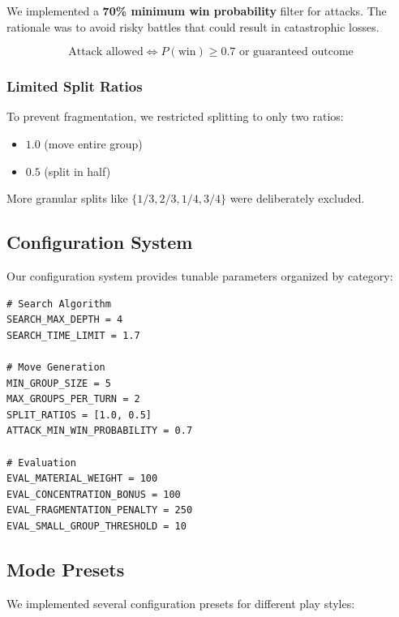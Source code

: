 \documentclass[11pt,a4paper]{article}
\begin{document}
We implemented a \textbf{70\% minimum win probability} filter for attacks. The rationale was to avoid risky battles that could result in catastrophic losses.

\begin{equation}
\text{Attack allowed} \iff P(\text{win}) \geq 0.7 \text{ or } \text{guaranteed outcome}
\end{equation}

\subsubsection{Limited Split Ratios}

To prevent fragmentation, we restricted splitting to only two ratios:
\begin{itemize}
    \item $1.0$ (move entire group)
    \item $0.5$ (split in half)
\end{itemize}

More granular splits like $\{1/3, 2/3, 1/4, 3/4\}$ were deliberately excluded.

\subsection{Configuration System}

Our configuration system provides tunable parameters organized by category:

\begin{lstlisting}[caption={Key Configuration Parameters (config.py)}]
# Search Algorithm
SEARCH_MAX_DEPTH = 4
SEARCH_TIME_LIMIT = 1.7

# Move Generation
MIN_GROUP_SIZE = 5
MAX_GROUPS_PER_TURN = 2
SPLIT_RATIOS = [1.0, 0.5]
ATTACK_MIN_WIN_PROBABILITY = 0.7

# Evaluation
EVAL_MATERIAL_WEIGHT = 100
EVAL_CONCENTRATION_BONUS = 100
EVAL_FRAGMENTATION_PENALTY = 250
EVAL_SMALL_GROUP_THRESHOLD = 10
\end{lstlisting}

\subsection{Mode Presets}

We implemented several configuration presets for different play styles:
\end{document}
